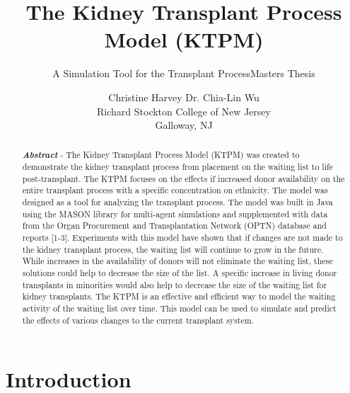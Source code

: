 \documentclass[9pt,a4paper,twocolumn]{scrartcl}
\begin{document}
\title{The Kidney Transplant Process Model (KTPM)}
\subtitle{A Simulation Tool for the Transplant Process}
\subtitle{Masters Thesis}
\author{
    Christine Harvey \qquad Dr. Chia-Lin Wu\\
    Richard Stockton College of New Jersey\\
    Galloway, NJ\\
}
\date{}

\maketitle

\begin{abstract}
\textit {\textbf {Abstract}} - The Kidney Transplant Process Model (KTPM) was created to demonstrate the kidney transplant process from placement on the waiting list to life post-transplant.  The KTPM focuses on the effects if increased donor availability on the entire transplant process with a specific concentration on ethnicity.  The model was designed as a tool for analyzing the transplant process.  The model was built in Java using the MASON library for multi-agent simulations and supplemented with data from the Organ Procurement and Transplantation Network (OPTN) database and reports [1-3].
Experiments with this model have shown that if changes are not made to the kidney transplant process, the waiting list will continue to grow in the future.  While increases in the availability of donors will not eliminate the waiting list, these solutions could help to decrease the size of the list.  A specific increase in living donor transplants in minorities would also help to decrease the size of the waiting list for kidney transplants.
The KTPM is an effective and efficient way to model the waiting activity of the waiting list over time.  This model can be used to simulate and predict the effects of various changes to the current transplant system.
\end{abstract}

\section{Introduction}
\end{document}
